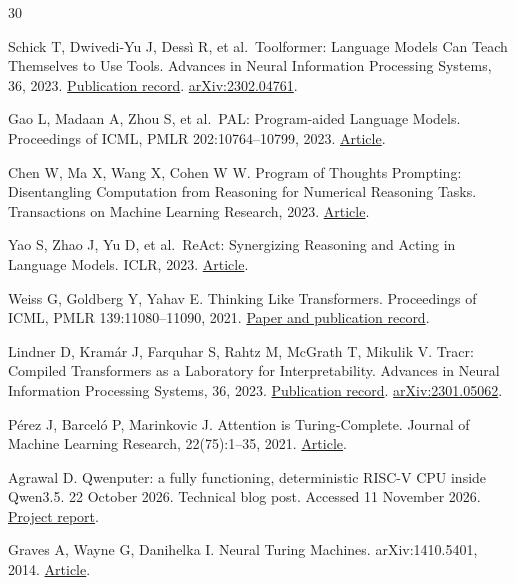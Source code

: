 \documentclass[11pt,a4paper]{article}
\begin{document}
\begin{thebibliography}{30}

Schick T, Dwivedi-Yu J, Dessì R, et al.~Toolformer: Language Models Can Teach Themselves to Use Tools. Advances in Neural Information Processing Systems, 36, 2023. \href{https://proceedings.neurips.cc/paper_files/paper/2023/hash/d842425e4bf79ba039352da0f658a906-Abstract-Conference.html}{Publication record}. \href{https://arxiv.org/abs/2302.04761}{arXiv:2302.04761}.

Gao L, Madaan A, Zhou S, et al.~PAL: Program-aided Language Models. Proceedings of ICML, PMLR 202:10764--10799, 2023. \href{https://proceedings.mlr.press/v202/gao23f.html}{Article}.

Chen W, Ma X, Wang X, Cohen W W. Program of Thoughts Prompting: Disentangling Computation from Reasoning for Numerical Reasoning Tasks. Transactions on Machine Learning Research, 2023. \href{https://arxiv.org/abs/2211.12588}{Article}.

Yao S, Zhao J, Yu D, et al.~ReAct: Synergizing Reasoning and Acting in Language Models. ICLR, 2023. \href{https://arxiv.org/abs/2210.03629}{Article}.

Weiss G, Goldberg Y, Yahav E. Thinking Like Transformers. Proceedings of ICML, PMLR 139:11080--11090, 2021. \href{https://proceedings.mlr.press/v139/weiss21a.html}{Paper and publication record}.

Lindner D, Kramár J, Farquhar S, Rahtz M, McGrath T, Mikulik V. Tracr: Compiled Transformers as a Laboratory for Interpretability. Advances in Neural Information Processing Systems, 36, 2023. \href{https://proceedings.neurips.cc/paper_files/paper/2023/hash/771155abaae744e08576f1f3b4b7ac0d-Abstract-Conference.html}{Publication record}. \href{https://arxiv.org/abs/2301.05062}{arXiv:2301.05062}.

Pérez J, Barceló P, Marinkovic J. Attention is Turing-Complete. Journal of Machine Learning Research, 22(75):1--35, 2021. \href{https://jmlr.org/papers/v22/20-302.html}{Article}.

Agrawal D. Qwenputer: a fully functioning, deterministic RISC-V CPU inside Qwen3.5. 22 October 2026. Technical blog post. Accessed 11 November 2026. \href{https://divagr.com/blog/qwenputer}{Project report}.

Graves A, Wayne G, Danihelka I. Neural Turing Machines. arXiv:1410.5401, 2014. \href{https://arxiv.org/abs/1410.5401}{Article}.


\end{thebibliography}
\end{document}

